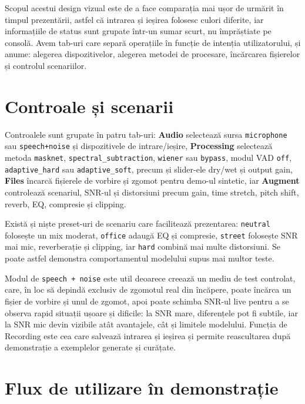 \documentclass[12pt,a4paper]{report}
\begin{document}
Scopul acestui design vizual este de a face comparația mai ușor de 
urmărit în timpul prezentării, astfel că intrarea și ieșirea folosesc 
culori diferite, iar informațiile de status sunt grupate într-un 
sumar scurt, nu împrăștiate pe consolă. Avem tab-uri care separă 
operațiile în funcție de intenția utilizatorului, și anume: alegerea 
dispozitivelor, alegerea metodei de procesare, încărcarea fișierelor 
și controlul scenariilor. 

\section{Controale și scenarii}

Controalele sunt grupate în patru tab-uri: \textbf{Audio} selectează sursa 
\texttt{microphone} sau \texttt{speech+noise} și dispozitivele de intrare/ieșire, 
\textbf{Processing} selectează metoda \texttt{masknet}, \texttt{spectral\_subtraction}, 
\texttt{wiener} sau \texttt{bypass}, modul VAD \texttt{off}, \texttt{adaptive\_hard} sau \texttt{adaptive\_soft}, 
precum și slider-ele dry/wet și output gain, \textbf{Files} încarcă fișierele de vorbire 
și zgomot pentru demo-ul sintetic, iar \textbf{Augment} controlează scenariul, 
SNR-ul și distorsiuni precum gain, time stretch, pitch shift, reverb, 
EQ, compresie și clipping.

Există și niște preset-uri de scenariu care facilitează prezentarea: 
\texttt{neutral} folosește un mix moderat, \texttt{office} adaugă EQ și compresie, 
\texttt{street} folosește SNR mai mic, reverberație și clipping, iar \texttt{hard} 
combină mai multe distorsiuni. Se poate astfel demonstra comportamentul modelului 
supus mai multor teste.

Modul de \texttt{speech + noise} este util deoarece creează un mediu de test 
controlat, care, în loc să depindă exclusiv de zgomotul real din 
încăpere, poate încărca un fișier de vorbire și unul de zgomot, apoi 
poate schimba SNR-ul live pentru a se observa rapid situații ușoare 
și dificile: la SNR mare, diferențele pot fi subtile, iar la SNR mic 
devin vizibile atât avantajele, cât și limitele modelului. Funcția de 
Recording este cea care salvează intrarea și ieșirea și permite 
reascultarea după demonstrație a exemplelor generate și curățate.

\section{Flux de utilizare în demonstrație}
\end{document}
